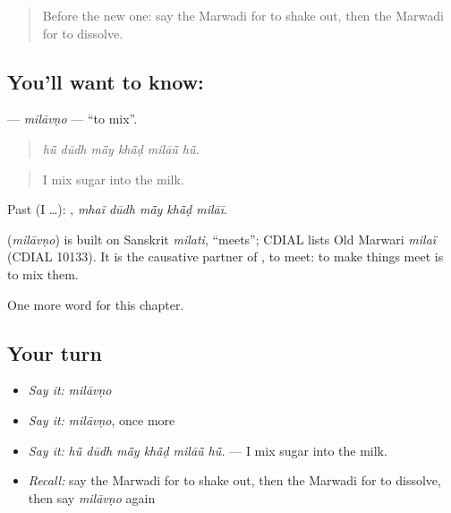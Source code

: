 \label{lesson:MW-C182-milavno}



\begin{quote}
Before the new one: say the Marwadi for to shake out, then the Marwadi for to dissolve.
\end{quote}

\subsection*{You'll want to know: }
\textbf{} — \emph{milāvṇo} — \textquotedblleft{}to mix\textquotedblright{}.

\begin{quote}
     
\end{quote}

\begin{quote}
\emph{hū̃ dūdh mā̃y khā̃ḍ milāū̃ hū̃.}
\end{quote}

\begin{quote}
I mix sugar into the milk.
\end{quote}

Past (I …):     , \emph{mhaĩ dūdh mā̃y khā̃ḍ milāī}.

\begin{cousinweb}
\textbf{} (\emph{milāvṇo}) is built on Sanskrit \emph{milati}, \textquotedblleft{}meets\textquotedblright{}; CDIAL lists Old Marwari \emph{milaï} (CDIAL 10133). It is the causative partner of \textbf{}, to meet: to make things meet is to mix them.
\end{cousinweb}

\begin{grammarlens}[title={What you've built}]
One more word for this chapter.
\end{grammarlens}

\subsection*{Your turn}
\begin{itemize}
\raggedright
  \item \emph{Say it:} \emph{milāvṇo}
  \item \emph{Say it:} \emph{milāvṇo}, once more
  \item \emph{Say it:} \emph{hū̃ dūdh mā̃y khā̃ḍ milāū̃ hū̃.} — I mix sugar into the milk.
  \item \emph{Recall:} say the Marwadi for to shake out, then the Marwadi for to dissolve, then say \emph{milāvṇo} again
\end{itemize}

